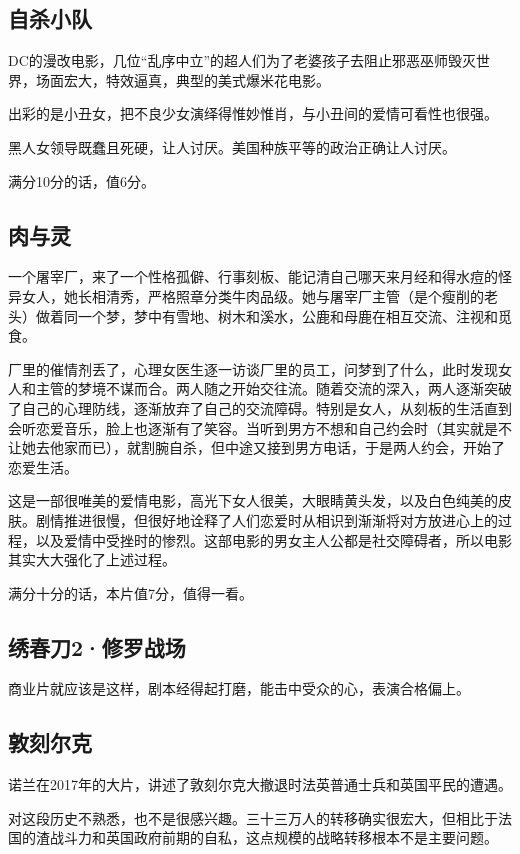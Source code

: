 \subsection{自杀小队}
DC的漫改电影，几位“乱序中立”的超人们为了老婆孩子去阻止邪恶巫师毁灭世界，场面宏大，特效逼真，典型的美式爆米花电影。

出彩的是小丑女，把不良少女演绎得惟妙惟肖，与小丑间的爱情可看性也很强。

黑人女领导既蠢且死硬，让人讨厌。美国种族平等的政治正确让人讨厌。

满分10分的话，值6分。

\subsection{肉与灵}

一个屠宰厂，来了一个性格孤僻、行事刻板、能记清自己哪天来月经和得水痘的怪异女人，她长相清秀，严格照章分类牛肉品级。她与屠宰厂主管（是个瘦削的老头）做着同一个梦，梦中有雪地、树木和溪水，公鹿和母鹿在相互交流、注视和觅食。

厂里的催情剂丢了，心理女医生逐一访谈厂里的员工，问梦到了什么，此时发现女人和主管的梦境不谋而合。两人随之开始交往流。随着交流的深入，两人逐渐突破了自己的心理防线，逐渐放弃了自己的交流障碍。特别是女人，从刻板的生活直到会听恋爱音乐，脸上也逐渐有了笑容。当听到男方不想和自己约会时（其实就是不让她去他家而已），就割腕自杀，但中途又接到男方电话，于是两人约会，开始了恋爱生活。

这是一部很唯美的爱情电影，高光下女人很美，大眼睛黄头发，以及白色纯美的皮肤。剧情推进很慢，但很好地诠释了人们恋爱时从相识到渐渐将对方放进心上的过程，以及爱情中受挫时的惨烈。这部电影的男女主人公都是社交障碍者，所以电影其实大大强化了上述过程。

满分十分的话，本片值7分，值得一看。

\subsection{绣春刀2·修罗战场}

商业片就应该是这样，剧本经得起打磨，能击中受众的心，表演合格偏上。

\subsection{敦刻尔克}
诺兰在2017年的大片，讲述了敦刻尔克大撤退时法英普通士兵和英国平民的遭遇。

对这段历史不熟悉，也不是很感兴趣。三十三万人的转移确实很宏大，但相比于法国的渣战斗力和英国政府前期的自私，这点规模的战略转移根本不是主要问题。

